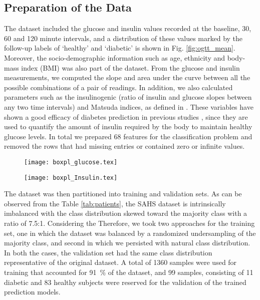 \documentclass[journal,comsoc]{IEEEtran}
\renewcommand{\^}{\hat}  %
\begin{document}
\subsection{Preparation of the Data}
%
The dataset included the glucose and insulin values recorded at the baseline, \num{30}, \num{60} and \num{120} minute intervals, and a distribution of these values marked by the follow-up labels of `healthy' and `diabetic' is shown in Fig. \ref{fig:ogtt_mean}. Moreover, the socio-demographic information such as age, ethnicity and body-mass index (BMI) was also part of the dataset. From the glucose and insulin measurements, we computed the slope and area under the curve between all the possible combinations  of a pair of readings. In addition, we also calculated parameters such as the insulinogenic (ratio of insulin and glucose slopes between any two time intervals) and Matsuda indices, as defined in \cite{Matsuda1462,abdul-ghani_plasma_2009}. These variables have shown a good efficacy of diabetes prediction in previous studies \cite{abdul-ghani_what_2007,abdul-ghani_plasma_2009}, since they are used to quantify the amount of insulin required by the body to maintain healthy glucose levels. In total we prepared \num{68} features for the classification problem and removed the rows that had missing entries or contained zero or infinite values.
%
\begin{figure*}
  \centering
  \begin{subfigure}[b]{\columnwidth}        %
    \centering
    \texttt{[image: boxpl\_glucose.tex]}
    \label{fig:glucose}
  \end{subfigure}
  \hfill
  \begin{subfigure}[b]{\columnwidth}        %
    \centering
    \texttt{[image: boxpl\_Insulin.tex]}
    \label{fig:insulin}
  \end{subfigure}
  \caption{Box plots of glucose and insulin measurements for healthy and diabetic subjects.}
  \label{fig:ogtt_mean}
\end{figure*}
%
The dataset was then partitioned into training and validation sets. As can be observed from the Table \ref{tab:patients}, the SAHS dataset is intrinsically imbalanced with the class distribution skewed toward the majority class with a ratio of 7.5:1. Considering the Therefore, we took two approaches for the training set, one in which the dataset was balanced by a randomized undersampling of the majority class, and second in which we persisted with natural class distribution. In both the cases, the validation set had the same class distribution representative of the original dataset. A total of \num{1360} samples were used for training that accounted for \SI{91}{\percent} of the dataset, and \num{99} samples, consisting of \num{11} diabetic and \num{83} healthy subjects were reserved for the validation of the trained prediction models.
%
%
\end{document}
